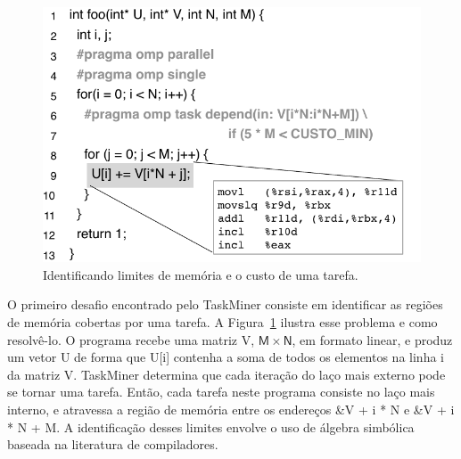 \documentclass[sigconf]{acmart}
\newcommand\Taskminer{\mbox{\textsf{TaskMiner}}}
\begin{document}
\begin{figure}[b!]
\begin{center}
\includegraphics[width=1\columnwidth]{images/ex_Regions}
\caption{Identificando limites de memória e o custo de uma tarefa.}
\label{fig:ex_Regions}
\end{center}
\end{figure}

O primeiro desafio encontrado pelo \Taskminer{} consiste em 
identificar as regiões de memória cobertas por uma tarefa.
A Figura~\ref{fig:ex_Regions} ilustra esse problema e como resolvê-lo. O programa
recebe uma matriz \textsf{V}, $\mathsf{M}\times\mathsf{N}$, em formato linear,
e produz um vetor  \textsf{U} de forma que  \textsf{U[i]} contenha a soma de todos
os elementos na linha  \textsf{i} da matriz  \textsf{V}. {\Taskminer} determina que cada
iteração do laço mais externo pode se tornar uma tarefa. Então, cada tarefa neste programa
consiste no laço mais interno, e atravessa a região de memória entre os endereços  \textsf{\&V + i * N} e
 \textsf{\&V + i * N + M}. A identificação desses limites envolve o uso de álgebra simbólica baseada
 na literatura de compiladores.
 
\end{document}
